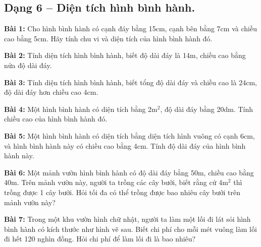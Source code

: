 \documentclass[11pt]{article}
\begin{document}
\subsection*{Dạng 6 – Diện tích hình bình hành.}

\textbf{Bài 1:} Cho hình bình hành có cạnh đáy bằng 15cm, cạnh bên bằng 7cm và chiều cao bằng 5cm. Hãy tính chu vi và diện tích của hình bình hành đó.

\begin{center}
\end{center}

\textbf{Bài 2:} Tính diện tích hình bình hành, biết độ dài đáy là 14m, chiều cao bằng nửa độ dài đáy.

\textbf{Bài 3:} Tính diện tích hình bình hành, biết tổng độ dài đáy và chiều cao là 24cm, độ dài đáy hơn chiều cao 4cm.

\textbf{Bài 4:} Một hình bình hành có diện tích bằng 2m$^2$, độ dài đáy bằng 20dm. Tính chiều cao của hình bình hành đó.

\textbf{Bài 5:} Một hình bình hành có diện tích bằng diện tích hình vuông có cạnh 6cm, và hình bình hành này có chiều cao bằng 4cm. Tính độ dài đáy của hình bình hành này.

\textbf{Bài 6:} Một mảnh vườn hình bình hành có độ dài đáy bằng 50m, chiều cao bằng 40m. Trên mảnh vườn này, người ta trồng các cây bưởi, biết rằng cứ 4m$^2$ thì trồng được 1 cây bưởi. Hỏi tối đa có thể trồng được bao nhiêu cây bưởi trên mảnh vườn này?

\textbf{Bài 7:} Trong một khu vườn hình chữ nhật, người ta làm một lối đi lát sỏi hình bình hành có kích thước như hình vẽ sau. Biết chi phí cho mỗi mét vuông làm lối đi hết 120 nghìn đồng. Hỏi chi phí để làm lối đi là bao nhiêu?

\begin{center}
\end{center}
\end{document}
